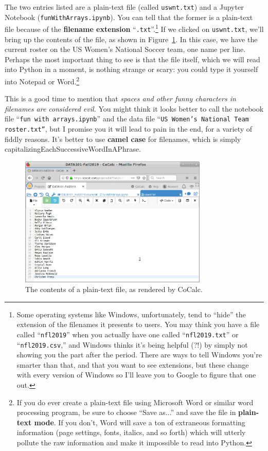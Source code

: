 The two entries listed are a plain-text file (called \texttt{uswnt.txt}) and a
Jupyter Notebook (\texttt{funWithArrays.ipynb}). You can tell that the former
is a plain-text file because of the \textbf{filename extension}
``\texttt{.txt}''.\footnote{Some operating systems like Windows, unfortunately,
tend to ``hide'' the extension of the filenames it presents to users. You may
think you have a file called ``\texttt{nfl2019}'' when you actually have one
called ``\texttt{nfl2019.txt}'' or ``\texttt{nfl2019.csv},'' and Windows thinks
it's being helpful (?!) by simply not showing you the part after the period.
There are ways to tell Windows you're smarter than that, and that you want to
see extensions, but these change with every version of Windows so I'll leave
you to Google to figure that one out.} If we clicked on \texttt{uswnt.txt},
we'll bring up the contents of the file, as shown in Figure~\ref{fig:textFile}.
In this case, we have the current roster on the US Women's National Soccer
team, one name per line. Perhaps the most important thing to see is that the
file itself, which we will read into Python in a moment, is nothing strange or
scary: you could type it yourself into Notepad or Word.\footnote{If you do ever
create a plain-text file using Microsoft Word or similar word processing
program, be sure to choose ``Save as...'' and save the file in
\textbf{plain-text mode}. If you don't, Word will save a ton of extraneous
formatting information (page settings, fonts, italics, and so forth) which will
utterly pollute the raw information and make it impossible to read into
Python.}


This is a good time to mention that \textit{spaces and other funny characters
in filenames are considered evil.} You might think it looks better to call the
notebook file ``\texttt{fun with arrays.ipynb}'' and the data file ``\texttt{US
Women's National Team roster.txt''}, but I promise you it will lead to pain in
the end, for a variety of fiddly reasons. It's better to use \textbf{camel
case} for filenames, which is simply
capitalizingEachSuccessive\-Word\-InAPhrase.

\begin{figure}[ht]
\centering
\includegraphics[width=0.8\textwidth]{textFile.png}
\medskip
\caption{The contents of a plain-text file, as rendered by CoCalc.}
\label{fig:textFile}
\end{figure}

